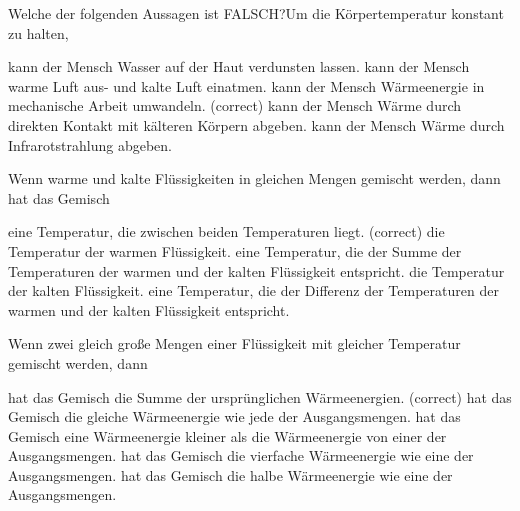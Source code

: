 \documentclass[11pt]{exam}
\begin{document}
\setlength{\voffset}{-0.5in}
\setlength{\headsep}{5pt}

\hspace{2mm}
 \hspace{5mm}
\vspace{4mm}

\begin{questions}

\question Welche der folgenden Aussagen ist FALSCH?Um die Körpertemperatur konstant zu halten,

\begin{choices}
	\choice kann der Mensch Wasser auf der Haut verdunsten lassen.
	\choice kann der Mensch warme Luft aus- und kalte Luft einatmen.
	\choice kann der Mensch Wärmeenergie in mechanische Arbeit umwandeln. (correct)
	\choice kann der Mensch Wärme durch direkten Kontakt mit kälteren Körpern abgeben.
	\choice kann der Mensch Wärme durch Infrarotstrahlung abgeben.
\end{choices}

\vspace{3mm}\question Wenn warme und kalte Flüssigkeiten in gleichen Mengen gemischt werden, dann hat das Gemisch

\begin{choices}
	\choice eine Temperatur, die zwischen beiden Temperaturen liegt. (correct)
	\choice die Temperatur der warmen Flüssigkeit.
	\choice eine Temperatur, die der Summe der Temperaturen der warmen und der kalten Flüssigkeit entspricht.
	\choice die Temperatur der kalten Flüssigkeit.
	\choice eine Temperatur, die der Differenz der Temperaturen der warmen und der kalten Flüssigkeit entspricht.
\end{choices}

\vspace{3mm}\question Wenn zwei gleich große Mengen einer Flüssigkeit mit gleicher Temperatur gemischt werden, dann

\begin{choices}
	\choice hat das Gemisch die Summe der ursprünglichen Wärmeenergien. (correct)
	\choice hat das Gemisch die gleiche Wärmeenergie wie jede der Ausgangsmengen.
	\choice hat das Gemisch eine Wärmeenergie kleiner als die Wärmeenergie von einer der Ausgangsmengen.
	\choice hat das Gemisch die vierfache Wärmeenergie wie eine der Ausgangsmengen.
	\choice hat das Gemisch die halbe Wärmeenergie wie eine der Ausgangsmengen.
\end{choices}


\end{questions}
\end{document}
